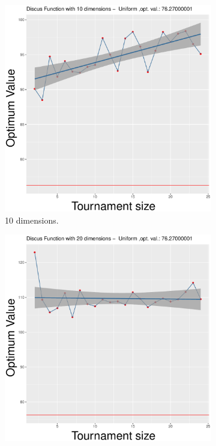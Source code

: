 \begin{figure}[t]
	\begin{subfigure}[b]{0.33\textwidth}
		\centering
		\includegraphics[width=\textwidth]{img/uniform-10D/unimodal_uniform_11_dim_10.pdf}
		\caption{10 dimensions.}
	\end{subfigure}
	\begin{subfigure}[b]{0.33\textwidth}
		\centering
		\includegraphics[width=\textwidth]{img/uniform-20D/unimodal_uniform_11_dim_20.pdf}

\end{subfigure}
\end{figure}
